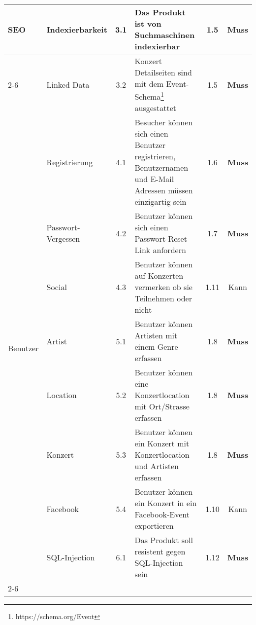 \begin{longtable}[]{@{}p{1.9cm}p{2.5cm}cp{5.5cm}cc@{}}
  \midrule
  \multirow{4}{*}{SEO}       & Indexierbarkeit            & 3.1          & Das Produkt ist von Suchmaschinen indexierbar                                                               & 1.5           & \textbf{Muss}                \\ \cline{2-6}
                             & Linked Data                & 3.2          & Konzert Detailseiten sind mit dem Event-Schema\footnote{https://schema.org/Event} ausgestattet              & 1.5           & \textbf{Muss}                \\
  \midrule
  \multirow{8}{*}{Benutzer}  & Registrierung              & 4.1          & Besucher können sich einen Benutzer registrieren, Benutzernamen und E-Mail Adressen müssen einzigartig sein & 1.6           & \textbf{Muss}                \\ \cline{2-6}
                             & Passwort-Vergessen         & 4.2          & Benutzer können sich einen Passwort-Reset Link anfordern                                                    & 1.7           & \textbf{Muss}                \\ \cline{2-6}
                             & Social                     & 4.3          & Benutzer können auf Konzerten vermerken ob sie Teilnehmen oder nicht                                        & 1.11          & Kann                         \\
  \midrule
  \clearpage
  \multirow{6}{*}{Erfassung} & Artist                     & 5.1          & Benutzer können Artisten mit einem Genre erfassen                                                           & 1.8           & \textbf{Muss}                \\ \cline{2-6}
                             & Location                   & 5.2          & Benutzer können eine Konzertlocation mit Ort/Strasse erfassen                                               & 1.8           & \textbf{Muss}                \\ \cline{2-6}
                             & Konzert                    & 5.3          & Benutzer können ein Konzert mit Konzertlocation und Artisten erfassen                                       & 1.8           & \textbf{Muss}                \\ \cline{2-6}
                             & Facebook                   & 5.4          & Benutzer können ein Konzert in ein Facebook-Event exportieren                                               & 1.10          & Kann                         \\
  \midrule
  \multirow{9}{*}{Security}  & SQL-Injection              & 6.1          & Das Produkt soll resistent gegen SQL-Injection sein                                                         & 1.12          & \textbf{Muss}                \\ \cline{2-6}

\end{longtable}
